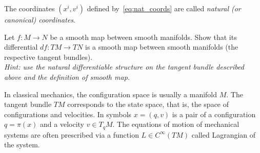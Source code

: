 The coordinates $(x^i, v^i)$ defined by~\eqref{eq:nat_coords} are called \emph{natural (or canonical) coordinates}.

\begin{exercise}
	Let $f:M\to N$ be a smooth map between smooth manifolds.
	Show that its differential $df: TM \to TN$ is a smooth map between smooth manifolds (the respective tangent bundles).\\
	\textit{\small Hint: use the natural differentiable structure on the tangent bundle described above and the definition of smooth map.}
\end{exercise}

\begin{remark}
	In classical mechanics, the configuration space is usually a manifold $M$.
	The tangent bundle $TM$ corresponds to the state space, that is, the space of configurations and velocities. In symbols $x=(q,v)$ is a pair of a configuration $q = \pi(x)$ and a velocity $v\in T_q M$.
	The equations of motion of mechanical systems are often prescribed via a function $L\in C^\infty(TM)$ called Lagrangian of the system.
\end{remark}
